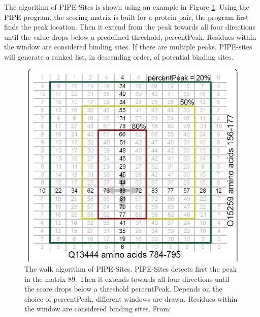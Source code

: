 The algorithm of PIPE-Sites is shown using an example in Figure \ref{fig_PIPE-Sites}. Using the PIPE program, the scoring matrix is built for a protein pair, the program first finds the peak location. Then it extend from the peak towards all four directions until the value drops below a predefined threshold, percentPeak. Residues within the window are considered binding sites. If there are multiple peaks, PIPE-sites will generate a ranked list, in descending order, of potential binding sites.

\begin{figure}[h!]
\begin{center}
\includegraphics[height =9 cm]{img/PIPE_site_cut.JPG}
\caption{The walk algorithm of PIPE-Sites. PIPE-Sites detects first the peak in the matrix 89. Then it extends towards all four directions until the score drops below a threshold percentPeak. Depends on the choice of percentPeak, different windows are drawn. Residues within the window are considered binding sites. From: \cite{amos2011binding}  \label{fig_PIPE-Sites}}
\end{center}
\end{figure} 


